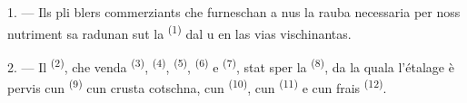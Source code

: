%
%
%
%
%
%

\VUsaut{4.0mm}
\VUsaut{3.0mm}

\VUsaut{3.0mm}

1. --- Ils pli blers commerziants che furneschan a nus la rauba necessaria per noss
nutriment sa radunan sut la  \textsuperscript{(1)} dal  u en
las vias vischinantas.

2. --- Il  \textsuperscript{(2)}, che venda 
\textsuperscript{(3)},  \textsuperscript{(4)}, 
\textsuperscript{(5)},  \textsuperscript{(6)} e 
\textsuperscript{(7)}, stat sper la 
\textsuperscript{(8)}, da la quala l'étalage è pervis cun 
\textsuperscript{(9)} cun crusta cotschna, cun 
\textsuperscript{(10)}, cun  \textsuperscript{(11)} e cun frais
 \textsuperscript{(12)}.

